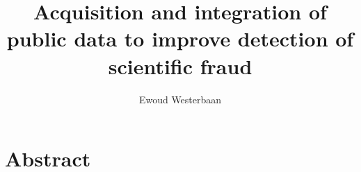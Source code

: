 \documentclass{ou-report}
\newcommand{\outline}[1]{{\color{blue} #1}}
\begin{document}
\pagestyle{plain}
\title{Acquisition and integration of public data to improve detection of scientific fraud}
\author{Ewoud Westerbaan}
%



\frontmatter 


\let\cleardoublepage\clearpage

%

%
\tableofcontents



%
%

\mainmatter
{}


\newcommand{\mi}[1]{\ensuremath{\mathit{#1}}}
\newcommand{\authors}{\mi{authors}}
\newcommand{\cites}{\mi{cites}}
\newcommand{\receives}{\mi{receives}}
\newcommand{\reviews}{\mi{reviews}}
\newcommand{\accepts}{\mi{accepts}}
\newcommand{\rejects}{\mi{rejects}}
\newcommand{\editorinchief}{\mi{EiC}}
\newcommand{\associateeditor}{\mi{AE}}
\newcommand{\Humans}{\mi{People}}
\newcommand{\Reviewers}{\mi{Reviewers}}
\newcommand{\Editors}{\mi{Editors}}


\chapter*{Abstract}

\end{document}
